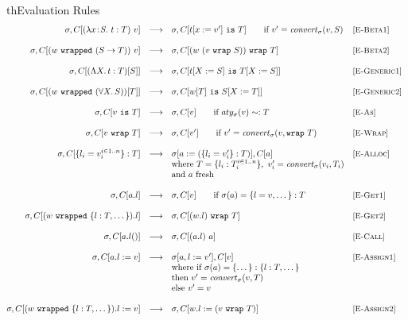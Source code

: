 \documentclass{article}
\newcommand{\fun}[1]{\mbox{\it #1\/}}
\newcommand{\lam}[4]{\lambda#1\!:\!#2.\,\,#4:#3}
\newcommand{\lamt}[2]{#1\rightarrow #2}
\newcommand{\app}[2]{#1~#2}
\newcommand{\Lam}[3]{\Lambda #1.\,#2:#3}
\newcommand{\App}[2]{#1[#2]}
\newcommand{\Lamt}[2]{\forall #1.\,#2}
\newcommand{\cast}[2]{#1~\t{is}~#2}
\newcommand{\convert}[2]{{#1}\convertword{#2}}
\newcommand{\convertword}{\mbox{\,\,$\sim :$\,\,}}
\renewcommand{\t}[1]{{\tt #1}}
\newcommand{\red}[0]{\longrightarrow}  %
\newcommand{\lred}[0]{\red}  %
\newcommand{\objty}[1]{\{#1\}}
\newcommand{\obje}[2]{\{#1\}:{#2}}
\newcommand{\objget}[2]{#1.#2}
\newcommand{\objcall}[2]{#1.#2()}
\newcommand{\objset}[3]{#1.#2:=#3}
\newcommand{\wrapty}[1]{\t{wrap}~#1}
\newcommand{\wrapv}[2]{#1~\t{wrapped}~#2}
\newcommand{\wrap}[2]{#1~\t{wrap}~#2}
\newcommand{\compatible}[2]{#1 \sim: #2 }
\newcommand{\allocty}[1]{aty_{\sigma}(#1)}
\renewcommand{\convert}[2]{\fun{convert}_{\sigma}(#1,#2)}
\begin{document}
\begin{displayfigure}{th}{Evaluation Rules}
\label{fig:eval} 
\footnotesize
\[
\begin{array}{@{}rcllr}
	\sigma,C[{\app{(\lam{x}{S}{T}{t})}{v}}]
	&\lred&
	\sigma,C[\cast{t[x:=v']}{T}]
	\qquad\mbox{if $v'=\convert v S$}
	&\rel{E-Beta1}
\\~\\
	\sigma,C[{\app{(\wrapv{w}{(\lamt{S}{T})})}
	              {v}}]
	&\lred&
	\sigma,C[\wrap{(w~(\wrap{v}{S}))}{T}]
	&\rel{E-Beta2}
\\~\\
	\sigma,C[{\App{(\Lam{X}{t}{T})}{S}}]
	&\lred&
	\sigma,C[\cast{t[X:=S]}{T[X:=S]}]
	&\rel{E-Generic1}
\\~\\
	\sigma,C[{\App{(\wrapv{w}{(\Lamt{X}{S})})}
		          {T}}]
	&\lred&
	\sigma,C[\cast{\App{w}{T}}{S[X:=T]}]
	&\rel{E-Generic2}
\\~\\
	\sigma,C[\cast{v}{T}]
	&\lred&
	\sigma,C[v]
	\qquad\mbox{if $\compatible{\allocty v}{T}$}
	&\rel{E-As}
\\~\\
	\sigma,C[\wrap{v}{T}]
	&\lred& 
	\sigma,C[v']
	\qquad\mbox{if $v'=\convert v {\wrapty T}$}
 	&\rel{E-Wrap} 
\\~\\
	\sigma,C[\obje{l_i=v_i^{i\in 1..n}}{T}]
	&\lred&
	\sigma[a:=(\obje{l_i=v'_i}{T})],C[a] 
	&\rel{E-Alloc} \\
	&&\mbox{where }T=\objty{l_i:T_i^{i\in 1..n}}, ~v'_i=\convert{v_i}{T_i} \\
	&&\mbox{and $a$ fresh}
\\~\\
	\sigma,C[\objget{a}{l}]
	&\lred&
	\sigma,C[v]
	\qquad\mbox{if $\sigma(a)=\obje{l=v,\dots}{T}$}
	&\rel{E-Get1}
\\~\\
	\sigma,C[\objget{(\wrapv{w}{\objty{l:T,\dots}})}{l}]
	&\lred&
	\sigma,C[\wrap{(\objget{w}{l})}{T}] 
	&\rel{E-Get2}
\\~\\
	\sigma,C[\objcall{a}{l}]
	&\lred&
	\sigma,C[\app{(\objget a l)} a]
	&\rel{E-Call}
\\~\\
	\sigma,C[\objset{a}{l}{v}]
	&\lred&
	\sigma[a,l:=v'],C[v] 
	&\rel{E-Assign1} \\
	&&\mbox{where if $\sigma(a)=\obje{\dots}{\objty{l:T,\dots}}$ }\\
	&&\mbox{then $v'=\convert{v}{T}$} \\
	&&\mbox{else $v'=v$} 
\\~\\
	\sigma,C[\objset{(\wrapv{w}{\objty{l:T,\dots}})}{l}{v}]
	&\lred&
	\sigma,C[\objset{w}{l}{(\wrap{v}{T})}]
	&\rel{E-Assign2} \\
\end{array}
\]
\end{displayfigure}
\end{document}
